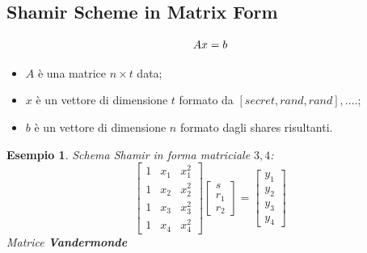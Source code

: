 \documentclass{book}
\newtheorem{esempio}{\textcolor{Grey1}{Esempio}}
\begin{document}
\subsection{Shamir Scheme in Matrix Form}
\begin{equation*}
	\centering
	Ax=b
\end{equation*}
\begin{itemize}
	\item \(A\) è una matrice \(n\times t\) data;
	\item \(x\) è un vettore di dimensione \(t\) formato da \([secret,rand,rand],.\ldots \);
	\item \(b\) è un vettore di dimensione \(n\) formato dagli shares risultanti.
\end{itemize}
\begin{esempio}
	Schema Shamir in forma matriciale \(3,4\):\begin{equation*}
		\begin{bmatrix}
			1 & x_{1} & x_{1}^2 \\
			1 & x_{2} & x_{2}^2 \\
			1 & x_{3} & x_{3}^2 \\
			1 & x_{4} & x_{4}^2
		\end{bmatrix}
		\begin{bmatrix}
			s \\r_{1}\\r_{2}
		\end{bmatrix}=\begin{bmatrix}
			y_{1} \\y_{2}\\y_{3}\\y_{4}
		\end{bmatrix}
	\end{equation*}
	Matrice \textbf{Vandermonde}
\end{esempio}
\end{document}
